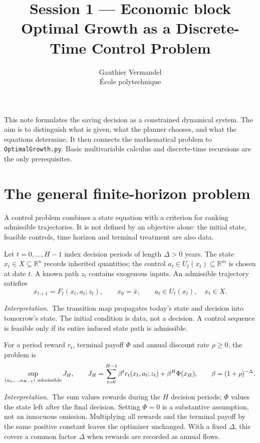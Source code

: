 \documentclass[11pt,a4paper]{article}
\title{\small Session 1 --- Economic block\\[0.6em]
\LARGE Optimal Growth as a Discrete-Time Control Problem}
\author{Gauthier Vermandel\\\small \'Ecole polytechnique}
\date{}
\newcommand{\interp}{\par\smallskip\noindent\textit{Interpretation.}\ }
\newcommand{\R}{\mathbb{R}}
\begin{document}
\maketitle

This note formulates the saving decision as a constrained dynamical system.
The aim is to distinguish what is given, what the planner chooses, and what
the equations determine. It then connects the mathematical problem to
\texttt{OptimalGrowth.py}. Basic multivariable calculus and discrete-time
recursions are the only prerequisites.

\section{The general finite-horizon problem}
A control problem combines a state equation with a criterion for ranking
admissible trajectories. It is not defined by an objective alone: the initial
state, feasible controls, time horizon and terminal treatment are also data.

Let $t=0,\ldots,H-1$ index decision periods of length $\Delta>0$ years.
The state $x_t\in X\subseteq\R^n$ records inherited quantities; the control
$a_t\in U_t(x_t)\subseteq\R^m$ is chosen at date $t$. A known path $z_t$
contains exogenous inputs. An admissible trajectory satisfies
\begin{equation}\label{eq:generalstate}
 x_{t+1}=F_t(x_t,a_t;z_t),\qquad
 x_0=\bar x,\qquad a_t\in U_t(x_t),\quad x_t\in X.
\end{equation}
\interp The transition map propagates today's state and decision into
tomorrow's state. The initial condition is data, not a decision. A control
sequence is feasible only if its entire induced state path is admissible.

For a period reward $r_t$, terminal payoff $\Phi$ and annual discount rate
$\rho\geq0$, the problem is
\begin{equation}\label{eq:generalproblem}
 \sup_{(a_0,\ldots,a_{H-1})\ {\rm admissible}}
 J_H,\qquad
 J_H=\sum_{t=0}^{H-1}\beta^t r_t(x_t,a_t;z_t)
       +\beta^H\Phi(x_H),\qquad
 \beta=(1+\rho)^{-\Delta}.
\end{equation}
\interp The sum values rewards during the $H$ decision periods; $\Phi$
values the state left after the final decision. Setting $\Phi=0$ is a
substantive assumption, not an innocuous omission. Multiplying all rewards
and the terminal payoff by the same positive constant leaves the optimizer
unchanged. With a fixed $\Delta$, this covers a common factor $\Delta$
when rewards are recorded as annual flows.
\end{document}

